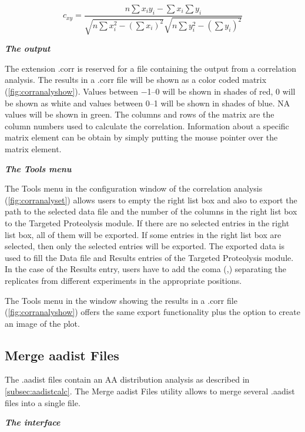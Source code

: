 \begin{equation}
\label{eq:pearsoncorrelation}
c_{xy} = \frac{n\sum{x_iy_i} - \sum{x_i}\sum{y_i}}{\sqrt{n\sum{x_i^2}-(\sum{x_i})^2}\sqrt{n\sum{y_i^2}-(\sum{y_i})^2}}
\end{equation} 

\textit{\textbf{The output}}

The extension .corr is reserved for a file containing the output from a correlation analysis. The results in a .corr file will be shown as a color coded matrix (\autoref{fig:corranalyshow}). Values between \numrange{-1}{0} will be shown in shades of red, \num{0} will be shown as white and values between \numrange{0}{1} will be shown in shades of blue. NA values will be shown in green. The columns and rows of the matrix are the column numbers used to calculate the correlation. Information about a specific matrix element can be obtain by simply putting the mouse pointer over the matrix element.  

\textit{\textbf{The Tools menu}}

The Tools menu in the configuration window of the correlation analysis (\autoref{fig:corranalyset}) allows users to empty the right list box and also to export the path to the selected data file and the number of the columns in the right list box to the Targeted Proteolysis module. If there are no selected entries in the right list box, all of them will be exported. If some entries in the right list box are selected, then only the selected entries will be exported. The exported data is used to fill the Data file and Results entries of the Targeted Proteolysis module. In the case of the Results entry, users have to add the coma (,) separating the replicates from different experiments in the appropriate positions. 

The Tools menu in the window showing the results in a .corr file (\autoref{fig:corranalyshow}) offers the same export functionality plus the option to create an image of the plot.

\subsection{Merge aadist Files}
\label{subsec:mergeaadistfiles}

The .aadist files contain an AA distribution analysis as described in \autoref{subsec:aadistcalc}. The Merge aadist Files utility allows to merge several .aadist files into a single file.

\textit{\textbf{The interface}}


